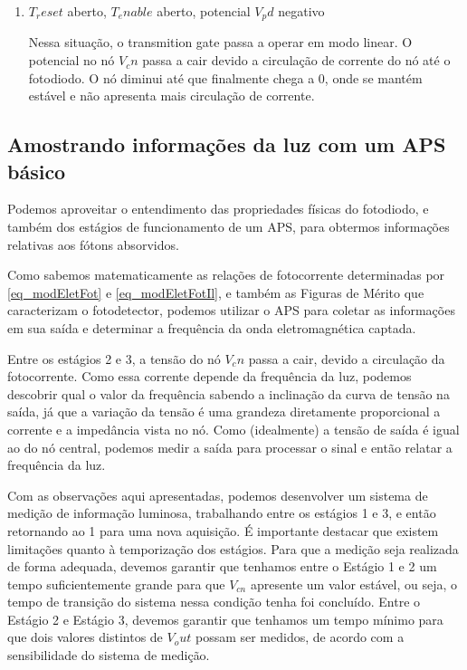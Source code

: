\begin{enumerate}
\item \emph{$T_reset$} aberto, \emph{$T_enable$} aberto, potencial \emph{$V_pd$} negativo

Nessa situação, o transmition gate passa a operar em modo linear. O potencial no n\'o $V_cn$ passa a cair devido a circulação de corrente do n\'o at\'e o fotodiodo. O nó diminui at\'e que finalmente chega a 0, onde se mant\'em estável e não apresenta mais circula{\c c}\~ao de corrente.

\end{enumerate}

\subsection{Amostrando informações da luz com um APS básico}

Podemos aproveitar o entendimento das propriedades f\'isicas do fotodiodo, e tamb\'em dos est\'agios de funcionamento de um APS, para obtermos informações relativas aos f\'otons absorvidos.

Como sabemos matematicamente as relações de fotocorrente determinadas por \autoref{eq_modEletFot} e \autoref{eq_modEletFotIl}, e tamb\'em as Figuras de M\'erito que caracterizam o fotodetector, podemos utilizar o APS para coletar as informações em sua sa\'ida e determinar a frequência da onda eletromagn\'etica captada.

Entre os est\'agios 2 e 3, a tens\~ao do n\'o $V_cn$ passa a cair, devido a circula{\c c}\~ao da fotocorrente. Como essa corrente depende da frequ\^encia da luz, podemos descobrir qual o valor da frequ\^encia sabendo a inclina{\c c}\~ao da curva de tens\~ao na sa\'ida, j\'a que a varia{\c c}\~ao da tens\~ao \'e uma grandeza diretamente proporcional a corrente e a imped\^ancia vista no n\'o. Como (idealmente) a tens\~ao de sa\'ida \'e igual ao do n\'o central, podemos medir a sa\'ida para processar o sinal e ent\~ao relatar a frequ\^encia da luz.

Com as observa{\c c}\~oes aqui apresentadas, podemos desenvolver um sistema de medi{\c c}\~ao de informa{\c c}\~ao luminosa, trabalhando entre os est\'agios 1 e 3, e ent\~ao retornando ao 1 para uma nova aquisi{\c c}\~ao. \'E importante destacar que existem limitações quanto \`a temporiza{\c c}\~ao dos est\'agios. Para que a medi{\c c}\~ao seja realizada de forma adequada, devemos garantir que tenhamos entre o Est\'agio 1 e 2 um tempo suficientemente grande para que $V_{cn}$ apresente um valor estável, ou seja, o tempo de transi{\c c}\~ao do sistema nessa condi{\c c}\~ao tenha foi conclu\'ido. Entre o Est\'agio 2 e Est\'agio 3, devemos garantir que tenhamos um tempo mínimo para que dois valores distintos de $V_out$ possam ser medidos, de acordo com a sensibilidade do sistema de medi{\c c}\~ao.

